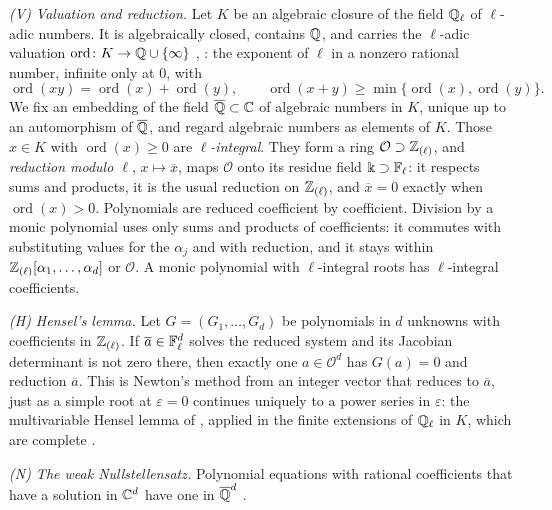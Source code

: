 \emph{\textup{(V)} Valuation and reduction.} Let \(K\) be an algebraic
closure of the field \(\mathbb Q_\ell\) of \(\ell\)-adic numbers. It is
algebraically closed, contains \(\mathbb Q\), and carries the \(\ell\)-adic
valuation \(\operatorname{ord}\colon K\to\mathbb Q\cup\{\infty\}\)
\citep[Chapter~III]{Koblitz1984},
\citep[Chapter~II, Theorem~(4.8)]{Neukirch1999}: the exponent of
\(\ell\) in a nonzero rational number, infinite only at \(0\), with
\begin{equation}\label{eq:valuation-rules}
 \operatorname{ord}(xy)=\operatorname{ord}(x)+\operatorname{ord}(y),\qquad
 \operatorname{ord}(x+y)\ge\min\{\operatorname{ord}(x),\operatorname{ord}(y)\}.
\end{equation}
We fix an embedding of the field \(\overline{\mathbb Q}\subset\mathbb C\) of algebraic
numbers in \(K\), unique up to an automorphism of \(\overline{\mathbb Q}\), and
regard algebraic numbers as elements of \(K\). Those \(x\in K\) with
\(\operatorname{ord}(x)\ge0\) are \emph{\(\ell\)-integral}. They form a
ring \(\mathcal O\supset\mathbb Z_{(\ell)}\), and \emph{reduction modulo
\(\ell\)}, \(x\mapsto\overline x\), maps \(\mathcal O\) onto its residue
field \(\Bbbk\supset\mathbb F_\ell\): it respects sums and products, it is the
usual reduction on \(\mathbb Z_{(\ell)}\), and \(\overline x=0\) exactly when
\(\operatorname{ord}(x)>0\). Polynomials are reduced coefficient by
coefficient. Division by a monic polynomial uses only sums and products
of coefficients: it commutes with substituting values for the
\(\alpha_j\) and with reduction, and it stays within
\(\mathbb Z_{(\ell)}[\alpha_1,\ldots,\alpha_d]\) or \(\mathcal O\). A monic
polynomial with \(\ell\)-integral roots has \(\ell\)-integral
coefficients.

\emph{\textup{(H)} Hensel's lemma.} Let \(G=(G_1,\ldots,G_d)\) be
polynomials in \(d\) unknowns with coefficients in \(\mathbb Z_{(\ell)}\). If
\(\overline a\in\mathbb F_\ell^d\) solves the reduced system and its Jacobian
determinant is not zero there, then exactly one \(a\in\mathcal O^d\) has
\(G(a)=0\) and reduction \(\overline a\). This is Newton's method from
an integer vector that reduces to \(\overline a\), just as a simple root
at \(\varepsilon=0\) continues uniquely to a power series in
\(\varepsilon\): the multivariable Hensel lemma of \citet{ConradHensel},
applied in the finite extensions of \(\mathbb Q_\ell\) in \(K\), which are
complete \citep[Chapter~II, Theorem~(4.8)]{Neukirch1999}.

\emph{\textup{(N)} The weak Nullstellensatz.} Polynomial equations with
rational coefficients that have a solution in \(\mathbb C^d\) have one in
\(\overline{\mathbb Q}^d\) \citep[Chapter~4, \S1]{CoxLittleOSheaIVA}.


